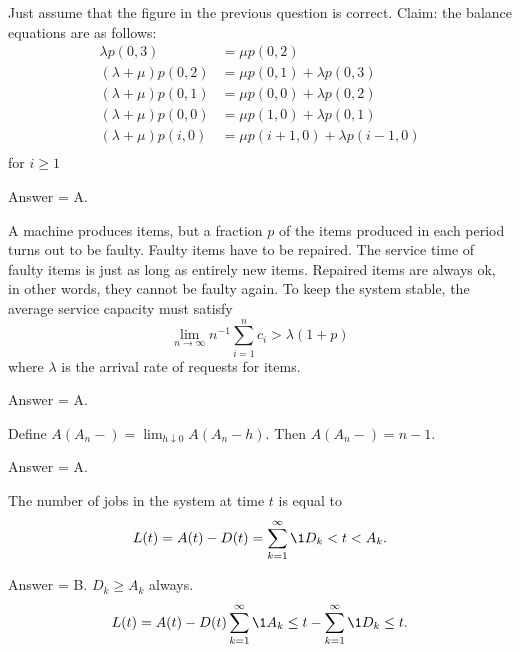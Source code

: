 \begin{exercise}[201807]
Just assume that the figure in the previous question is correct. Claim: the balance equations are as follows:
\begin{align*}
\lambda p(0,3) &= \mu p(0,2) \\
(\lambda+\mu) p(0,2) &= \mu p(0,1) + \lambda p(0,3)\\
(\lambda+\mu) p(0,1) &= \mu p(0,0) + \lambda p(0,2)\\
(\lambda+\mu) p(0,0) &= \mu p(1,0) + \lambda p(0,1)\\
(\lambda+\mu) p(i,0) &= \mu p(i+1,0) + \lambda p(i-1,0)\\
\end{align*}
for $i\geq 1$
\begin{solution}
Answer = A.
\end{solution}
\end{exercise}


\begin{exercise}[201902]
A machine produces items, but a fraction $p$ of the
items produced in each period turns out to be faulty. Faulty items have to be repaired. The service time of faulty items is just as long as entirely new items.
Repaired items are always ok, in other words, they cannot be faulty again. To keep the system stable, the average service capacity must satisfy
 \begin{equation*}
\lim_{n\to \infty} n^{-1}\sum_{i=1}^n c_i > \lambda (1+p)
\end{equation*}
where $\lambda$ is the arrival rate of requests for items. 
\begin{solution}
Answer = A.
\end{solution}
\end{exercise}

\begin{exercise}[201902]
Define $A(A_n-) = \lim_{h\downarrow 0} A(A_n - h)$. Then $A(A_n-) = n-1$. 

\begin{solution}
Answer = A.
\end{solution}
\end{exercise}

\begin{exercise}[201902]
The number of jobs in the system at time $t$ is equal to 
 \begin{equation*}
 L(t)= A(t) - D(t) = \sum_{k=1}^\infty \1{D_k < t < A_k}.
 \end{equation*}

\begin{solution}
Answer = B. $D_k \geq A_k$ always. 
 \begin{equation*}
 L(t)= A(t) - D(t) \sum_{k=1}^\infty \1{A_k \leq t} - \sum_{k=1}^\infty \1{D_k \leq t}.
 \end{equation*}
\end{solution}
\end{exercise}

